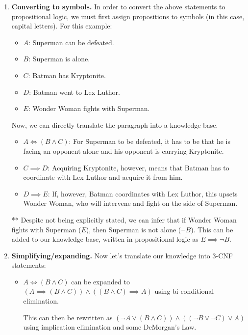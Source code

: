 \documentclass[12pt]{article}
\begin{document}
\begin{enumerate}[label=(\alph*)]

    \item \textbf{Converting to symbols.} In order to convert the above statements to propositional logic, we must first assign propositions to symbols (in this case, capital letters). For this example:
    \begin{itemize}
        \item $A$: Superman can be defeated.
        \item $B$: Superman is alone.
        \item $C$: Batman has Kryptonite.
        \item $D$: Batman went to Lex Luthor.
        \item $E$: Wonder Woman fights with Superman.
    \end{itemize}
    
    Now, we can directly translate the paragraph into a knowledge base. 

    \begin{itemize}
        \item $A \iff (B \land C)$: For Superman to be defeated, it has to be that he is facing an opponent alone and his opponent is carrying Kryptonite.
        \item $C \implies D$: Acquiring Kryptonite, however, means that Batman has to coordinate with Lex Luthor and acquire it from him.
        \item $D \implies E$: If, however, Batman coordinates with Lex Luthor, this upsets Wonder Woman, who will intervene and fight on the side of Superman.
    \end{itemize}
    ** Despite not being explicitly stated, we can infer that if Wonder Woman fights with Superman ($E$), then Superman is not alone ($\neg B$). This can be added to our knowledge base, written in propositional logic as $E \implies \neg B$.

    \item \textbf{Simplifying/expanding.} Now let's translate our knowledge into 3-CNF statements:

        \begin{itemize}{}
            \item $A \iff (B \land C)$ can be expanded to $(A \implies (B \land C)) \land ((B \land C) \implies A)$ using bi-conditional elimination. 
        
            This can then be rewritten as $(\neg A \lor (B \land C)) \land ((\neg B \lor \neg C) \lor A)$ using implication elimination and some DeMorgan's Law. 
        

\end{itemize}
\end{enumerate}
\end{document}
